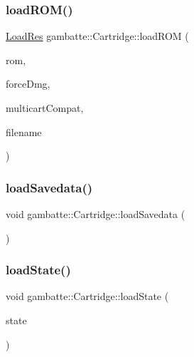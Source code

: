 \subsubsection{\texorpdfstring{load\+R\+O\+M()}{loadROM()}\hspace{0.1cm}{\footnotesize\ttfamily [3/3]}}
{\footnotesize\ttfamily \hyperlink{namespacegambatte_a42606f494711d2e2870a5f5cdf69e468}{Load\+Res} gambatte\+::\+Cartridge\+::load\+R\+OM (\begin{DoxyParamCaption}\item[{\hyperlink{classgambatte_1_1File}{File} $\ast$}]{rom,  }\item[{const bool}]{force\+Dmg,  }\item[{const bool}]{multicart\+Compat,  }\item[{const std\+::string \&}]{filename }\end{DoxyParamCaption})}

\mbox{\label{classgambatte_1_1Cartridge_af46947d940c5b4ad32713c8c1070ae0e}} 
\subsubsection{\texorpdfstring{load\+Savedata()}{loadSavedata()}}
{\footnotesize\ttfamily void gambatte\+::\+Cartridge\+::load\+Savedata (\begin{DoxyParamCaption}{ }\end{DoxyParamCaption})}

\mbox{\label{classgambatte_1_1Cartridge_a2ea9929b798d88065ae39114a496d9b5}} 
\subsubsection{\texorpdfstring{load\+State()}{loadState()}}
{\footnotesize\ttfamily void gambatte\+::\+Cartridge\+::load\+State (\begin{DoxyParamCaption}\item[{\hyperlink{structgambatte_1_1SaveState}{Save\+State} const \&}]{state }\end{DoxyParamCaption})}

